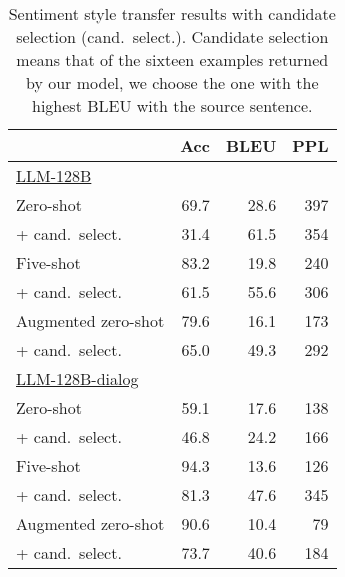 
\begin{table}
\caption{
Sentiment style transfer results with candidate selection (cand.~select.). 
Candidate selection means that of the sixteen examples returned by our model, we choose the one with the highest BLEU with the source sentence.  
}
\label{tab:candidate_select}
    \centering \small 
        \begin{tabular}{l r r r}
        \toprule
         & Acc & BLEU & PPL\\
        \midrule
        \underline{LLM-128B} \\
        Zero-shot & 69.7 & 28.6 & 397 \\
        + cand.~select. & 31.4 & 61.5 & 354\\
        Five-shot & 83.2 & 19.8 & 240\\
        + cand.~select. & 61.5 & 55.6 & 306\\
        Augmented zero-shot & 79.6 & 16.1 & 173\\
        + cand.~select. & 65.0 & 49.3 & 292\\
        \midrule
        \underline{LLM-128B-dialog} \\
        Zero-shot & 59.1 & 17.6 & 138\\
        + cand.~select. & 46.8 & 24.2 & 166\\
        Five-shot & 94.3 & 13.6 & 126\\
        + cand.~select. & 81.3 & 47.6 & 345\\
        Augmented zero-shot & 90.6 & 10.4 & 79\\
        + cand.~select. & 73.7 & 40.6 & 184\\
        \bottomrule
        \end{tabular}
\end{table}